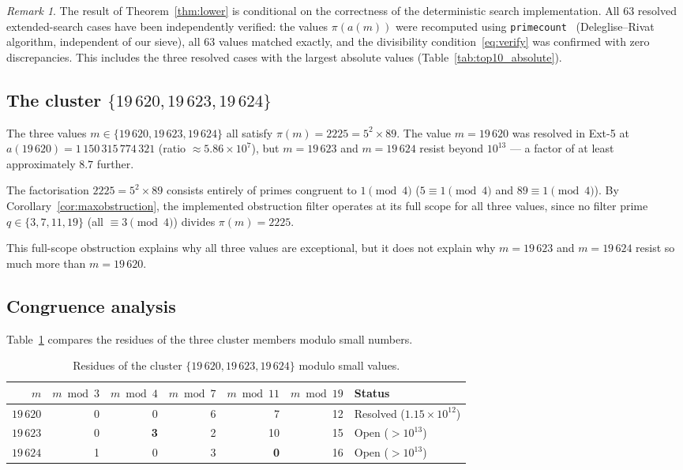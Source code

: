 \documentclass[11pt]{article}
\theoremstyle{definition}
\theoremstyle{remark}
\newtheorem{remark}{Remark}
\numberwithin{equation}{section}
\begin{document}
\begin{remark}
The result of Theorem~\textup{\ref{thm:lower}} is conditional on
the correctness of the deterministic search implementation.
All $63$ resolved extended-search cases have been independently
verified: the values $\pi(a(m))$ were recomputed using
\texttt{primecount}~\textup{\cite{primecount}}
(Deleglise--Rivat algorithm, independent of our sieve), all
$63$ values matched exactly, and the divisibility
condition~\eqref{eq:verify} was confirmed with zero
discrepancies.  This includes the three resolved cases with the
largest absolute values
\textup{(}Table~\textup{\ref{tab:top10_absolute})}.
\end{remark}

\subsection{The cluster \texorpdfstring{$\{19\,620, 19\,623, 19\,624\}$}{\{19620, 19623, 19624\}}}

The three values $m \in \{19\,620, 19\,623, 19\,624\}$ all satisfy
$\pi(m) = 2225 = 5^2 \times 89$.  The value $m = 19\,620$ was
resolved in Ext-5 at $a(19\,620) = 1\,150\,315\,774\,321$
(ratio $\approx 5.86 \times 10^7$), but $m = 19\,623$ and
$m = 19\,624$ resist beyond $10^{13}$ --- a factor of at least
approximately $8.7$ further.

The factorisation $2225 = 5^2 \times 89$ consists entirely of
primes congruent to $1 \pmod{4}$ ($5 \equiv 1 \pmod{4}$ and
$89 \equiv 1 \pmod{4}$).  By Corollary~\ref{cor:maxobstruction},
the implemented obstruction filter operates at its full scope for
all three values, since no filter prime $q \in \{3, 7, 11, 19\}$
(all $\equiv 3 \pmod{4}$) divides $\pi(m) = 2225$.

This full-scope obstruction explains why all three values are
exceptional, but it does not explain why $m = 19\,623$ and
$m = 19\,624$ resist so much more than $m = 19\,620$.

\subsection{Congruence analysis}

Table~\ref{tab:congruences} compares the residues of the three
cluster members modulo small numbers.

\begin{table}[ht]
\centering
\caption{Residues of the cluster $\{19\,620, 19\,623, 19\,624\}$
modulo small values.}
\label{tab:congruences}
\begin{tabular}{rrrrrrl}
\toprule
$m$ & $m \bmod 3$ & $m \bmod 4$ & $m \bmod 7$ & $m \bmod 11$
  & $m \bmod 19$ & Status \\
\midrule
$19\,620$ & 0 & 0 & 6 & 7 & 12 & Resolved ($1.15 \times 10^{12}$) \\
$19\,623$ & 0 & \textbf{3} & 2 & 10 & 15 & Open ($> 10^{13}$) \\
$19\,624$ & 1 & 0 & 3 & \textbf{0} & 16 & Open ($> 10^{13}$) \\
\bottomrule
\end{tabular}
\end{table}
\end{document}
